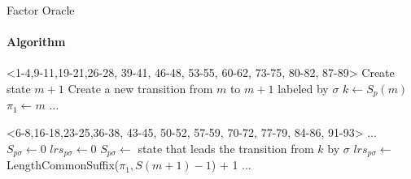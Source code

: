 \begin{frame}[fragile]{Factor Oracle}
  \framesubtitle{Algorithm}
  \begin{algorithm}[H]
    \caption{Incremental update of Factor Oracle}\label{alg:addletter}
    \begin{algorithmic}[1]

      \only<1-4,9-11,19-21,26-28, 39-41, 46-48, 53-55, 60-62, 73-75,
      80-82, 87-89>{%
        \State Create state $m+1$
        \State Create a new transition from $m$ to $m+1$ labeled by
        $\sigma$ 
        \State $k \gets S_{p}(m)$
        \State $\pi_{1} \gets m$
        \State $\dots$
      }



      \only<6-8,16-18,23-25,36-38, 43-45, 50-52, 57-59, 70-72, 77-79,
      84-86, 91-93>{
        \State $\dots$
        \State $S_{p\sigma} \gets 0$
        \State $lrs_{p\sigma} \gets 0$
        \Else
        \State $S_{p\sigma}\gets $ state that leads the transition
        from $k$ by $\sigma$
        \State $lrs_{p\sigma} \gets $ LengthCommonSuffix($\pi_{1},S(m+1)-1$) + 1
        \EndIf
        \State $\dots$
      }


      \EndFunction
    \end{algorithmic}
  \end{algorithm}

  \begin{center}
\end{center}
\end{frame}
